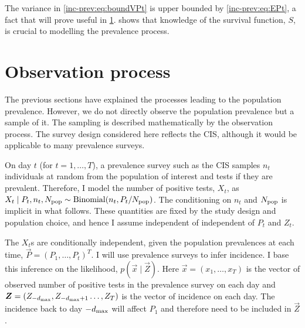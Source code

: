 \documentclass[thesis.tex]{subfiles}
\begin{document}
The variance in \cref{inc-prev:eq:boundVPt} is upper bounded by \cref{inc-prev:eq:EPt}, a fact that will prove useful in \cref{inc-prev:sec:observation-process}.
 shows that knowledge of the survival function, $S$, is crucial to modelling the prevalence process.

\section{Observation process} \label{inc-prev:sec:observation-process}

The previous sections have explained the processes leading to the population prevalence.
However, we do not directly observe the population prevalence but a sample of it.
The sampling is described mathematically by the observation process.
The survey design considered here reflects the CIS, although it would be applicable to many prevalence surveys.

On day $t$ (for $t = 1, \dots, T$), a prevalence survey such as the CIS samples $n_t$ individuals at random from the population of interest and tests if they are prevalent.
Therefore, I model the number of positive tests, $X_t$, as $X_t \mid P_t, n_t, N_\text{pop} \sim \operatorname{Binomial}(n_t, P_t/N_\text{pop})$.
The conditioning on $n_t$ and $N_\text{pop}$ is implicit in what follows.
These quantities are fixed by the study design and population choice, and hence I assume independent of independent of $P_t$ and $Z_t$.

The $X_t$s are conditionally independent, given the population prevalences at each time, $\vec{P} = (P_1, \dots, P_t)^T$. 
I will use prevalence surveys to infer incidence.
I base this inference on the likelihood, $p(\vec{x} \mid \vec{Z})$.%
Here $\vec{x} = (x_1, \dots, x_T)$ is the vector of observed number of positive tests in the prevalence survey on each day and $\bm{Z} = (Z_{-d_\text{max}}, Z_{-d_\text{max}+1} \dots, Z_T)$ is the vector of incidence on each day.
The incidence back to day $-d_\text{max}$ will affect $P_1$ and therefore need to be included in $\vec{Z}$. 
\end{document}
